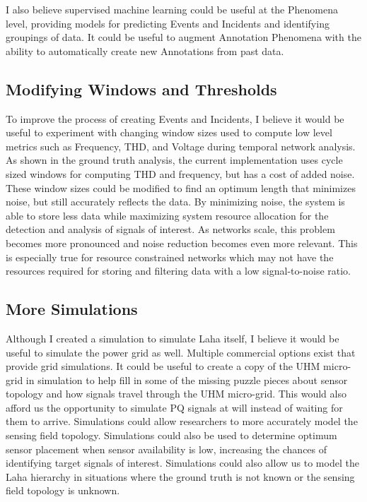 I also believe supervised machine learning could be useful at the Phenomena level, providing models for predicting Events and Incidents and identifying groupings of data. It could be useful to augment Annotation Phenomena with the ability to automatically create new Annotations from past data.

\subsection{Modifying Windows and Thresholds}\label{subsec:modifying-windows-and-thresholds}
To improve the process of creating Events and Incidents, I believe it would be useful to experiment with changing window sizes used to compute low level metrics such as Frequency, THD, and Voltage during temporal network analysis. As shown in the ground truth analysis, the current implementation uses cycle sized windows for computing THD and frequency, but has a cost of added noise. These window sizes could be modified to find an optimum length that minimizes noise, but still accurately reflects the data. By minimizing noise, the system is able to store less data while maximizing system resource allocation for the detection and analysis of signals of interest. As networks scale, this problem becomes more pronounced and noise reduction becomes even more relevant. This is especially true for resource constrained networks which may not have the resources required for storing and filtering data with a low signal-to-noise ratio.

\subsection{More Simulations}\label{subsec:more-simulations}
Although I created a simulation to simulate Laha itself, I believe it would be useful to simulate the power grid as well. Multiple commercial options exist that provide grid simulations. It could be useful to create a copy of the UHM micro-grid in simulation to help fill in some of the missing puzzle pieces about sensor topology and how signals travel through the UHM micro-grid. This would also afford us the opportunity to simulate PQ signals at will instead of waiting for them to arrive. Simulations could allow researchers to more accurately model the sensing field topology. Simulations could also be used to determine optimum sensor placement when sensor availability is low, increasing the chances of identifying target signals of interest. Simulations could also allow us to model the Laha hierarchy in situations where the ground truth is not known or the sensing field topology is unknown.


